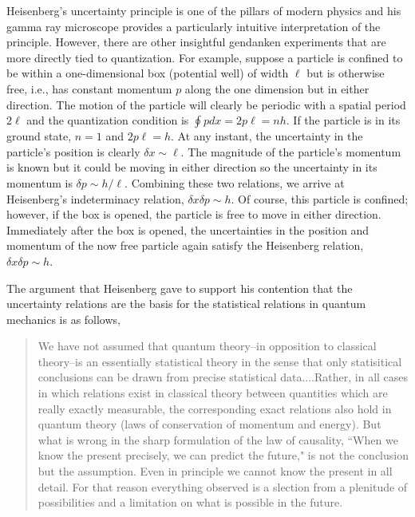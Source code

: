 \documentclass[12pt]{article}
\begin{document}
Heisenberg's uncertainty principle is one of the pillars of modern physics and his gamma ray microscope provides a particularly intuitive interpretation of the principle.  However, there are other insightful gendanken experiments that are more directly tied to quantization.  For example, suppose a particle is confined to be within a one-dimensional box (potential well) of width $\ell$ but is otherwise free, i.e., has constant momentum $p$ along the one dimension but in either direction.  The motion of the particle will clearly be periodic with a spatial period $2\ell$ and the quantization condition is $\oint pdx=2p\ell=nh$.  If the particle is in its ground state, $n=1$ and $2p\ell=h$.  At any instant, the uncertainty in the particle's position is clearly $\delta x\sim \ell$.  The magnitude of the particle's momentum is known but it could be moving in either direction so the uncertainty in its momentum is $\delta p \sim h/\ell$.  Combining these two relations, we arrive at Heisenberg's indeterminacy relation, $\delta x\delta p \sim h$.  Of course, this particle is confined; however, if the box is opened, the particle is free to move in either direction.  Immediately after the box is opened, the uncertainties in the position and momentum of the now free particle again satisfy the Heisenberg relation, $\delta x\delta p \sim h$.

The argument that Heisenberg gave to support his contention that the uncertainty relations are the basis for the statistical relations in quantum mechanics is  as follows,\cite{He1927}
\begin{quote}
We have not assumed that quantum theory--in opposition to classical theory--is an essentially statistical theory in the sense that only statisitical conclusions can be drawn from precise statistical data....Rather, in all cases in which relations exist in classical theory between quantities which are really exactly measurable, the corresponding exact relations also hold in quantum theory (laws of conservation of momentum and energy).  But what is wrong in the sharp formulation of the law of causality, ``When we know the present precisely, we can predict the future," is not the conclusion but the assumption.  Even in principle we cannot know the present in all detail.  For that reason everything observed is a slection from a plenitude of possibilities and a limitation on what is possible in the future.
\end{quote} 
  
\end{document}
